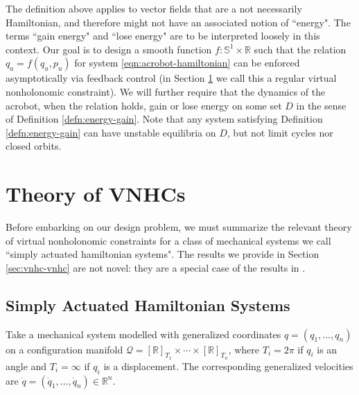 \documentclass[journal,twoside,web, twocolumn,draftcls]{ieeecolor}
\newcommand*{\Rt}[1]{[\R]_{#1}}
\newcommand*{\R}{\mathbb{R}}
\newcommand*{\Sone}{\mathbb{S}^1}
\begin{document}
The definition above applies to vector fields that are a not necessarily
Hamiltonian, and therefore might not have an associated notion of ``energy". 
The terms ``gain energy" and ``lose energy" are to be interpreted loosely in
this context.
Our goal is to design a smooth function \(f : \Sone \times \R\) such that the
relation \(q_a = f(q_u,p_u)\) for system \eqref{eqn:acrobot-hamiltonian}
can be enforced asymptotically via feedback control (in Section \ref{sec:vnhc}
we call this a regular virtual nonholonomic constraint).  
We will further require that the dynamics of the acrobot, when the relation
holds, gain or lose energy on some set \(D\) in the sense of Definition
\ref{defn:energy-gain}. 
Note that any system satisfying Definition \ref{defn:energy-gain}
can have unstable equilibria on \(D\), but not limit cycles nor closed orbits.

\section{Theory of VNHCs}\label{sec:vnhc}
Before embarking on our design problem, we must summarize the relevant
theory of virtual nonholonomic constraints for a class of mechanical systems we
call ``simply actuated hamiltonian systems". 
The results we provide in Section \ref{sec:vnhc-vnhc} are not novel:
they are a special case of the results in
\cite{hybrid_zero_dynamics_bipedal_nhvcs}.

\subsection{Simply Actuated Hamiltonian Systems} \label{sec:vnhc-sah}
Take a mechanical system modelled with generalized coordinates 
\(q = (q_1, \ldots, q_n)\) on a configuration manifold
\(\mathcal{Q} = \Rt{T_1} \times \cdots \times \Rt{T_n}\), where
\(T_i = 2\pi\) if \(q_i\) is an angle and \(T_i = \infty\) if \(q_i\) is a
displacement. The corresponding generalized velocities are 
\(\dot{q} = (\dot{q}_1,\ldots,\dot{q}_n) \in \R^n\).
\end{document}
